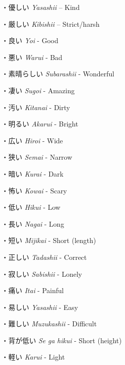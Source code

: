 \par{・優しい \emph{Yasashii }– Kind }
 
\par{・厳しい \emph{Kibishii }– Strict\slash harsh }
 
\par{・良い \emph{Yoi }- Good }
 
\par{・悪い \emph{Warui }- Bad }
 
\par{・素晴らしい \emph{Subarashii }- Wonderful }
 
\par{・凄い \emph{Sugoi }- Amazing }
 
\par{・汚い \emph{Kitanai }- Dirty }
 
\par{・明るい \emph{Akarui }- Bright }
 
\par{・広い \emph{Hiroi }- Wide }
 
\par{・狭い \emph{Semai }- Narrow }
 
\par{・暗い \emph{Kurai }- Dark }
 
\par{・怖い \emph{Kowai }- Scary }
 
\par{・低い \emph{Hikui }- Low }
 
\par{・長い \emph{Nagai }- Long }
 
\par{・短い \emph{Mijikai }- Short (length) }
 
\par{・正しい \emph{Tadashii }- Correct }
 
\par{・寂しい \emph{Sabishii }- Lonely }
 
\par{・痛い \emph{Itai }- Painful }
 
\par{・易しい \emph{Yasashii }- Easy }
 
\par{・難しい \emph{Muzukashii }- Difficult }
 
\par{・背が低い \emph{Se ga hikui }- Short (height) }
 
\par{・軽い \emph{Karui }- Light }
 
